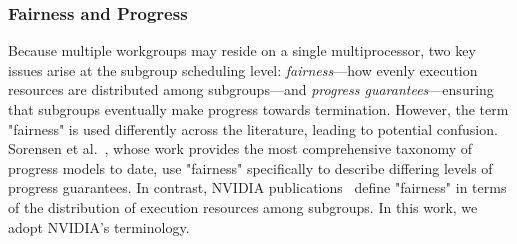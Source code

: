\documentclass[sigconf]{acmart}
\begin{document}
\subsubsection{Fairness and Progress}
Because multiple workgroups may reside on a single multiprocessor, two key issues arise at the subgroup scheduling level: \emph{fairness}---how evenly execution resources are distributed among subgroups---and \emph{progress guarantees}---ensuring that subgroups eventually make progress towards termination. However, the term "fairness" is used differently across the literature, leading to potential confusion. Sorensen et al.~\cite{sorensen2016,sorensen2018,sorensen2021}, whose work provides the most comprehensive taxonomy of progress models to date, use "fairness" specifically to describe differing levels of progress guarantees. In contrast, NVIDIA publications~\cite{4523358,Merrill2016} define "fairness" in terms of the distribution of execution resources among subgroups. In this work, we adopt NVIDIA's terminology.
\end{document}
